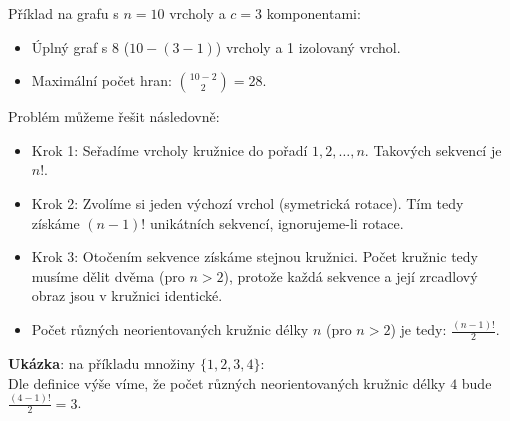 \documentclass[10pt, a4paper]{ReportSheet}
\begin{document}
    Příklad na grafu s $n=10$ vrcholy a $c=3$ komponentami:
    \begin{itemize}
        \item Úplný graf s 8 ($10-(3-1)$) vrcholy a 1 izolovaný vrchol.
        \item Maximální počet hran: $\binom{10-2}{2} = 28$.
    \end{itemize}

    \newpage

    \newpage

    Problém můžeme řešit následovně:
    \begin{itemize}
        \item Krok 1: Seřadíme vrcholy kružnice do pořadí $1, 2, \ldots, n$. Takových sekvencí je $n!$.
        \item Krok 2: Zvolíme si jeden výchozí vrchol (symetrická rotace). Tím tedy získáme $(n-1)!$ unikátních sekvencí, ignorujeme-li rotace.
        \item Krok 3: Otočením sekvence získáme stejnou kružnici. Počet kružnic tedy musíme dělit dvěma (pro $n>2$), protože každá sekvence a její zrcadlový obraz jsou v kružnici identické.
        \item Počet různých neorientovaných kružnic délky $n$ (pro $n>2$) je tedy: $\frac{(n-1)!}{2}$.
    \end{itemize}

    \textbf{Ukázka}: na příkladu množiny $\{1, 2, 3, 4\}$:\\
    Dle definice výše víme, že počet různých neorientovaných kružnic délky $4$ bude $\frac{(4-1)!}{2} = 3$.
\end{document}
